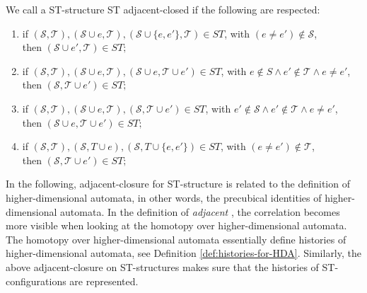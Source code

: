     \begin{definition}
        \label{def:ST adjacent-closure}
        We call a ST-structure ST adjacent-closed if the following are respected:
       
       \begin{enumerate}
           \item if $(\mathcal{S},\mathcal{T}), (\mathcal{S} \cup e, \mathcal{T}), (\mathcal{S} \cup \{e,e'\}, \mathcal{T}) \in ST$, with $(e \neq e') \notin \mathcal{S}$,\\
           then $(\mathcal{S} \cup e', \mathcal{T}) \in ST;$
           \item if $(\mathcal{S},\mathcal{T}), (\mathcal{S} \cup e, \mathcal{T}), (\mathcal{S} \cup e, \mathcal{T} \cup e') \in ST$, with $e \notin S \wedge e' \notin \mathcal{T} \wedge e \neq e'$, \\
           then $(\mathcal{S}, \mathcal{T} \cup e') \in ST;$
           \item if $(\mathcal{S},\mathcal{T}), (\mathcal{S} \cup e, \mathcal{T}), (\mathcal{S}, \mathcal{T} \cup e') \in ST$, with $e' \notin \mathcal{S} \wedge e' \notin \mathcal{T} \wedge e \neq e'$, \\
           then $(\mathcal{S} \cup e, \mathcal{T} \cup e') \in ST;$
           \item if $(\mathcal{S},\mathcal{T}), (\mathcal{S}, T \cup e), (\mathcal{S}, T \cup \{e,e'\}) \in ST$, with $(e \neq e') \notin \mathcal{T}$, \\
           then $(\mathcal{S}, \mathcal{T} \cup e') \in ST;$
       \end{enumerate}
    \end{definition}
    
    In the following, adjacent-closure for ST-structure is related to the definition of higher-dimensional automata, in other words, the precubical identities of higher-dimensional automata. In the definition of \emph{adjacent} \cite[Definition 19]{Glabbeek99invitedCONCUR}, the correlation becomes more visible when looking at the homotopy over higher-dimensional automata. The homotopy over higher-dimensional automata essentially define histories of higher-dimensional automata, see Definition \ref{def:histories-for-HDA}. Similarly, the above adjacent-closure on ST-structures makes sure that the histories of ST-configurations are represented.
    
